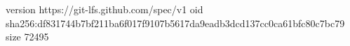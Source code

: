 version https://git-lfs.github.com/spec/v1
oid sha256:df831744b7bf211ba6f017f9107b5617da9eadb3dcd137cc0ca61bfc80c7bc79
size 72495
